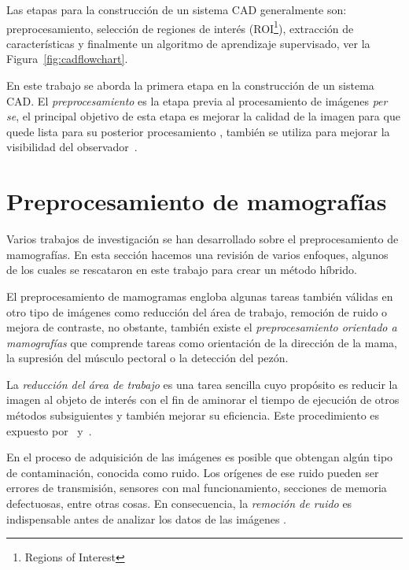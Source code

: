 Las etapas para la construcción de un sistema CAD generalmente son:
preprocesamiento, selección de regiones de interés (ROI\footnote{Regions of
Interest}), extracción de características y finalmente un algoritmo de
aprendizaje supervisado, ver la Figura~\ref{fig:cadflowchart}.

\shorthandoff{>} %
    
\shorthandon{>}

En este trabajo se aborda la primera etapa en la construcción de un sistema
CAD. El \textit{preprocesamiento} es la etapa previa al procesamiento de
imágenes \textit{per se}, el principal objetivo de esta etapa es mejorar la
calidad de la imagen para que quede lista para su posterior procesamiento
\cite{ponraj2011survey}, también se utiliza para mejorar la visibilidad del
observador~\cite{rahmati2010new}.

\section{Preprocesamiento de mamografías}

Varios trabajos de investigación se han desarrollado sobre el preprocesamiento
de mamografías. En esta sección hacemos una revisión de varios enfoques,
algunos de los cuales se rescataron en este trabajo para crear un método híbrido.

El preprocesamiento de mamogramas engloba algunas tareas también válidas en
otro tipo de imágenes como reducción del área de trabajo, remoción de ruido o
mejora de contraste, no obstante, también existe el \textit{preprocesamiento
orientado a mamografías} que comprende tareas como orientación de la dirección
de la mama, la supresión del músculo pectoral o la detección del pezón.

La \textit{reducción del área de trabajo} es una tarea sencilla cuyo propósito
es reducir la imagen al objeto de interés con el fin de aminorar el tiempo de
ejecución de otros métodos subsiguientes y también mejorar su eficiencia. Este
procedimiento es expuesto por~\cite{holguinpre} y~\cite{dehghani2011method}.

En el proceso de adquisición de las imágenes es posible que obtengan algún tipo
de contaminación, conocida como ruido. Los orígenes de ese ruido pueden ser
errores de transmisión, sensores con mal funcionamiento, secciones de memoria
defectuosas, entre otras cosas. En consecuencia, la \textit{remoción de ruido}
es indispensable antes de analizar los datos de las imágenes
\cite{motwani2004survey}.

